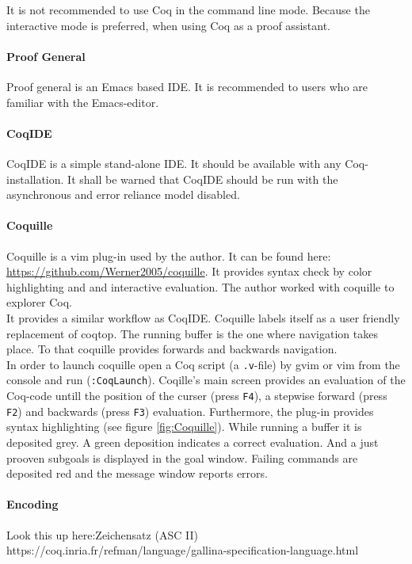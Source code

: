It is not recommended to use Coq in the command line mode. 
Because the interactive mode is preferred, when using Coq as a proof assistant. 


\paragraph{Proof General}

Proof general is an Emacs based IDE. 
It is recommended to users who are familiar with the Emacs-editor.

\paragraph{CoqIDE}

CoqIDE is a simple stand-alone IDE. 
It should be available with any Coq-installation. 
It shall be warned that CoqIDE should be run with the asynchronous and error reliance model disabled. 

\paragraph{Coquille}

Coquille is a vim plug-in used by the author.
It can be found here: \url{https://github.com/Werner2005/coquille}.
It provides syntax check by color highlighting and and interactive evaluation.  
The author worked with coquille to explorer Coq.\\
It provides a similar workflow as CoqIDE. 
Coquille labels itself as a user friendly  replacement of \gls{coqtop}. 
The running buffer is the one where navigation takes place. 
To that coquille provides forwards and backwards navigation.\\


In order to launch coquille open a Coq script (a \texttt{.v}-file) by gvim or vim from the console and run (\texttt{:CoqLaunch}). 
Coqille's main screen provides an evaluation of the Coq-code untill the position of the curser (press \texttt{F4}), a stepwise forward (press \texttt{F2}) and backwards (press \texttt{F3}) evaluation.                 
Furthermore, the plug-in provides syntax highlighting (see figure \ref{fig:Coquille}).
While running a buffer it is deposited grey.
A green deposition indicates a correct evaluation. 
And a just prooven subgoals is displayed in the goal window. 
Failing commands are deposited red and the message window reports errors.

\paragraph{Encoding }
Look this up here:Zeichensatz (ASC II)\\
https://coq.inria.fr/refman/language/gallina-specification-language.html

